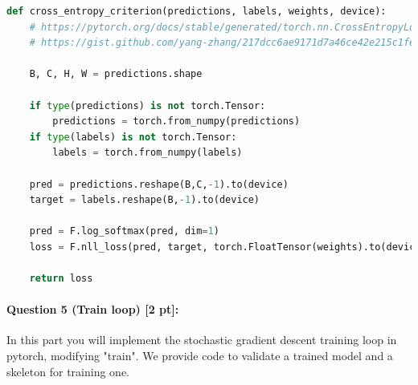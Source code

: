 \documentclass[11pt]{article}
\begin{document}
\begin{lstlisting}[language=Python, basicstyle=\scriptsize]
def cross_entropy_criterion(predictions, labels, weights, device):
    # https://pytorch.org/docs/stable/generated/torch.nn.CrossEntropyLoss.html#torch.nn.CrossEntropyLoss
    # https://gist.github.com/yang-zhang/217dcc6ae9171d7a46ce42e215c1fee0
    
    B, C, H, W = predictions.shape

    if type(predictions) is not torch.Tensor:
        predictions = torch.from_numpy(predictions)
    if type(labels) is not torch.Tensor:
        labels = torch.from_numpy(labels)

    pred = predictions.reshape(B,C,-1).to(device)
    target = labels.reshape(B,-1).to(device)

    pred = F.log_softmax(pred, dim=1)
    loss = F.nll_loss(pred, target, torch.FloatTensor(weights).to(device))

    return loss
\end{lstlisting}


\paragraph{Question 5 (Train loop) [2 pt]:} 
In this part you will implement the stochastic gradient descent training loop in pytorch, modifying "train". We provide code to validate a trained model and a skeleton for training one. 
\end{document}
